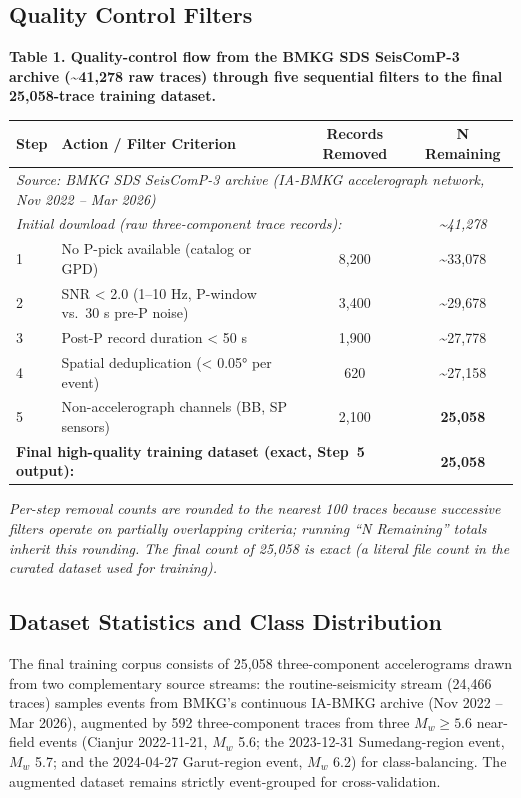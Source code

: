 \documentclass[10pt]{article}
\begin{document}
\subsection{Quality Control Filters}

\par\vspace{16pt}\noindent\begingroup\centering\fontsize{8}{10}\selectfont\textbf{Table 1. Quality-control flow from the BMKG SDS SeisComP-3 archive (\textasciitilde41{,}278 raw traces) through five sequential filters to the final 25{,}058-trace training dataset.}\par\endgroup\vspace{6pt}

\begin{longtable}[]{@{}llcc@{}}
\toprule
Step & Action / Filter Criterion & Records Removed & N Remaining\tabularnewline
\midrule
\endhead
\multicolumn{4}{l}{\textit{Source: BMKG SDS SeisComP-3 archive (IA-BMKG accelerograph network, Nov 2022 -- Mar 2026)}}\tabularnewline
\multicolumn{3}{l}{\textit{\quad Initial download (raw three-component trace records):}} & \textit{\textasciitilde41{,}278}\tabularnewline
\midrule
1 & No P-pick available (catalog or GPD) & 8,200 & \textasciitilde33,078\tabularnewline
2 & SNR \textless{} 2.0 (1--10 Hz, P-window vs.~30 s pre-P noise) & 3,400 & \textasciitilde29,678\tabularnewline
3 & Post-P record duration \textless{} 50 s & 1,900 & \textasciitilde27,778\tabularnewline
4 & Spatial deduplication (\textless{} 0.05° per event) & 620 & \textasciitilde27,158\tabularnewline
5 & Non-accelerograph channels (BB, SP sensors) & 2,100 & \textbf{25,058}\tabularnewline
\midrule
\multicolumn{3}{l}{\textbf{Final high-quality training dataset (exact, Step~5 output):}} & \textbf{25,058}\tabularnewline
\bottomrule
\end{longtable}

\noindent\textit{Per-step removal counts are rounded to the nearest 100 traces because successive filters operate on partially overlapping criteria; running ``N Remaining'' totals inherit this rounding. The final count of 25{,}058 is exact (a literal file count in the curated dataset used for training).}

\subsection{Dataset Statistics and Class Distribution}

The final training corpus consists of 25,058 three-component accelerograms drawn from two complementary source streams: the routine-seismicity stream (24,466 traces) samples events from BMKG's continuous IA-BMKG archive (Nov 2022 -- Mar 2026), augmented by 592 three-component traces from three \(M_w \geq 5.6\) near-field events (Cianjur 2022-11-21, \(M_w\) 5.6; the 2023-12-31 Sumedang-region event, \(M_w\) 5.7; and the 2024-04-27 Garut-region event, \(M_w\) 6.2) for class-balancing. The augmented dataset remains strictly event-grouped for cross-validation.
\end{document}
